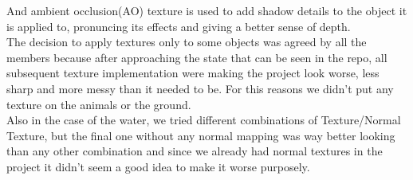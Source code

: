 \documentclass[a4paper, 11pt]{article}
\begin{document}
And ambient occlusion(AO) texture is used to add shadow details to the object it is applied to, pronuncing its effects and giving a better sense of depth.\\
The decision to apply textures only to some objects was agreed by all the members because after approaching the state that can be seen in the repo, all subsequent texture implementation were making the project look worse, less sharp and more messy than it needed to be. For this reasons we didn't put any texture on the animals or the ground.\\
Also in the case of the water, we tried different combinations of Texture/Normal Texture, but the final one without any normal mapping was way better looking than any other combination and since we already had normal textures in the project it didn't seem a good idea to make it worse purposely.\\
\end{document}
